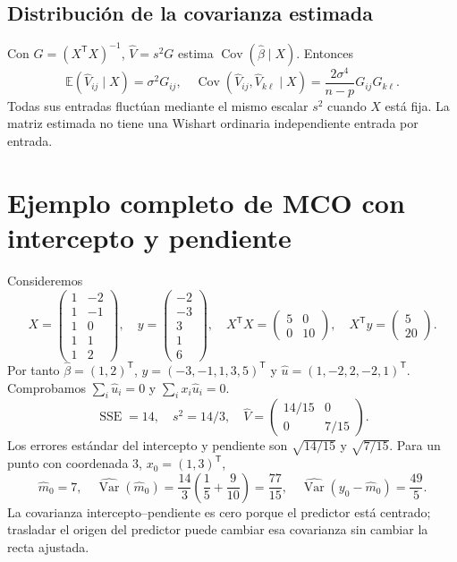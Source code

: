\documentclass[11pt,a4paper]{article}
\newcommand{\E}{\mathbb E}
\newcommand{\T}{^{\mathsf T}}
\DeclareMathOperator{\Var}{Var}
\DeclareMathOperator{\Cov}{Cov}
\theoremstyle{definition}
\begin{document}
\subsection{Distribución de la covarianza estimada}
Con $G=(X\T X)^{-1}$, $\widehat V=s^2G$ estima $\Cov(\widehat\beta\mid X)$. Entonces
\[
\E(\widehat V_{ij}\mid X)=\sigma^2G_{ij},\quad
\Cov(\widehat V_{ij},\widehat V_{k\ell}\mid X)
=\frac{2\sigma^4}{n-p}G_{ij}G_{k\ell}.
\]
Todas sus entradas fluctúan mediante el mismo escalar $s^2$ cuando $X$ está fija. La matriz estimada no tiene una Wishart ordinaria independiente entrada por entrada.

\section{Ejemplo completo de MCO con intercepto y pendiente}
Consideremos
\[
X=\begin{pmatrix}1&-2\\1&-1\\1&0\\1&1\\1&2\end{pmatrix},\quad
y=\begin{pmatrix}-2\\-3\\3\\1\\6\end{pmatrix},\quad
X\T X=\begin{pmatrix}5&0\\0&10\end{pmatrix},\quad X\T y=\begin{pmatrix}5\\20\end{pmatrix}.
\]
Por tanto $\widehat\beta=(1,2)\T$, $\widehat y=(-3,-1,1,3,5)\T$ y $\widehat u=(1,-2,2,-2,1)\T$. Comprobamos $\sum_i\widehat u_i=0$ y $\sum_i x_i\widehat u_i=0$.
\[
\operatorname{SSE}=14,\quad s^2=14/3,\quad
\widehat V=\begin{pmatrix}14/15&0\\0&7/15\end{pmatrix}.
\]
Los errores estándar del intercepto y pendiente son $\sqrt{14/15}$ y $\sqrt{7/15}$. Para un punto con coordenada $3$, $x_0=(1,3)\T$,
\[
\widehat m_0=7,\quad\widehat{\Var}(\widehat m_0)=\frac{14}3\left(\frac15+\frac9{10}\right)=\frac{77}{15},
\quad\widehat{\Var}(y_0-\widehat m_0)=\frac{49}5.
\]
La covarianza intercepto--pendiente es cero porque el predictor está centrado; trasladar el origen del predictor puede cambiar esa covarianza sin cambiar la recta ajustada.
\end{document}
